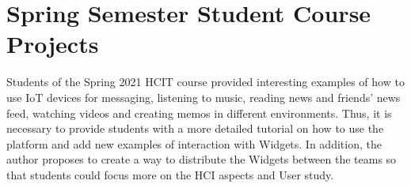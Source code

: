 \section{Spring Semester Student Course Projects}

Students of the Spring 2021 HCIT course provided interesting examples of how to use IoT devices for messaging, listening to music, reading news and friends' news feed, watching videos and creating memos in different environments. Thus, it is necessary to provide students with a more detailed tutorial on how to use the platform and add new examples of interaction with Widgets. In addition, the author proposes to create a way to distribute the  Widgets between the teams so that students could focus more on the HCI aspects and User study. 